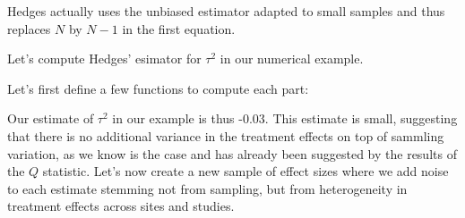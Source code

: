 \documentclass[]{book}
\newenvironment{Shaded}{\begin{snugshade}}{\end{snugshade}}
\newcommand{\KeywordTok}[1]{\textcolor[rgb]{0.13,0.29,0.53}{\textbf{#1}}}
\newcommand{\DataTypeTok}[1]{\textcolor[rgb]{0.13,0.29,0.53}{#1}}
\newcommand{\DecValTok}[1]{\textcolor[rgb]{0.00,0.00,0.81}{#1}}
\newcommand{\FloatTok}[1]{\textcolor[rgb]{0.00,0.00,0.81}{#1}}
\newcommand{\StringTok}[1]{\textcolor[rgb]{0.31,0.60,0.02}{#1}}
\newcommand{\ControlFlowTok}[1]{\textcolor[rgb]{0.13,0.29,0.53}{\textbf{#1}}}
\newcommand{\OperatorTok}[1]{\textcolor[rgb]{0.81,0.36,0.00}{\textbf{#1}}}
\newcommand{\NormalTok}[1]{#1}
\theoremstyle{definition}
\theoremstyle{definition}
\theoremstyle{definition}
\theoremstyle{remark}
\let\BeginKnitrBlock\begin \let\EndKnitrBlock\end
\begin{document}
\BeginKnitrBlock{remark}
\iffalse{} {Remark. } \fi{}Hedges actually uses the unbiased estimator
adapted to small samples and thus replaces \(N\) by \(N-1\) in the first
equation.
\EndKnitrBlock{remark}

\BeginKnitrBlock{example}
\protect\hypertarget{exm:unnamed-chunk-148}{}{\label{exm:unnamed-chunk-148}
}Let's compute Hedges' esimator for \(\tau^2\) in our numerical example.
\EndKnitrBlock{example}

Let's first define a few functions to compute each part:

\begin{Shaded}
\end{Shaded}

Our estimate of \(\tau^2\) in our example is thus -0.03. This estimate
is small, suggesting that there is no additional variance in the
treatment effects on top of sammling variation, as we know is the case
and has already been suggested by the results of the \(Q\) statistic.
Let's now create a new sample of effect sizes where we add noise to each
estimate stemming not from sampling, but from heterogeneity in treatment
effects across sites and studies.

\begin{Shaded}
\end{Shaded}
\end{document}
